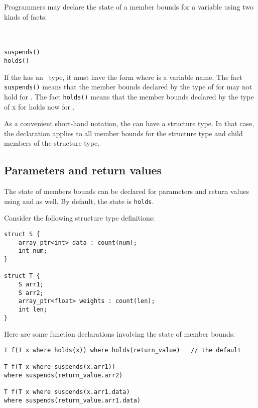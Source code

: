 Programmers may declare the state of a member bounds for a variable
using two kinds of facts:
\begin{tabbing}
\= \\
\> \var{\ldots{}} \\
\> \texttt{suspends()} \\
\> \texttt{holds()}
\end{tabbing}

If the  has an \arrayptr\ type, it must
have the form  where  is a variable name. 
The fact \texttt{suspends()} means that the
member bounds declared by the type of  for  may not
hold for . The fact \texttt{holds(}\texttt{)}
means that the member bounds declared by the type of x for 
holds now for .

As a convenient short-hand notation, the  can have
a structure type. In that case, the declaration applies to all member
bounds for the structure type and child members of the structure type.

\subsection{Parameters and return values}

The state of members bounds can be declared for parameters and return
values using  and  as well. By default, 
the state is \texttt{holds}.

Consider the following structure type definitions:

\begin{verbatim}
struct S {
    array_ptr<int> data : count(num);
    int num;
}

struct T {
    S arr1;
    S arr2;
    array_ptr<float> weights : count(len);
    int len;
}
\end{verbatim}

Here are some function declarations involving the state of member
bounds:
\begin{verbatim}
T f(T x where holds(x)) where holds(return_value)   // the default 

T f(T x where suspends(x.arr1))
where suspends(return_value.arr2)

T f(T x where suspends(x.arr1.data)
where suspends(return_value.arr1.data)
\end{verbatim}

